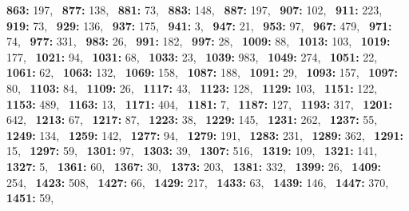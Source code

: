 \textbf{863:} 197,\allowbreak~ 
\textbf{877:} 138,\allowbreak~ 
\textbf{881:} 73,\allowbreak~ 
\textbf{883:} 148,\allowbreak~ 
\textbf{887:} 197,\allowbreak~ 
\textbf{907:} 102,\allowbreak~ 
\textbf{911:} 223,\allowbreak~ 
\textbf{919:} 73,\allowbreak~ 
\textbf{929:} 136,\allowbreak~ 
\textbf{937:} 175,\allowbreak~ 
\textbf{941:} 3,\allowbreak~ 
\textbf{947:} 21,\allowbreak~ 
\textbf{953:} 97,\allowbreak~ 
\textbf{967:} 479,\allowbreak~ 
\textbf{971:} 74,\allowbreak~ 
\textbf{977:} 331,\allowbreak~ 
\textbf{983:} 26,\allowbreak~ 
\textbf{991:} 182,\allowbreak~ 
\textbf{997:} 28,\allowbreak~ 
\textbf{1009:} 88,\allowbreak~ 
\textbf{1013:} 103,\allowbreak~ 
\textbf{1019:} 177,\allowbreak~ 
\textbf{1021:} 94,\allowbreak~ 
\textbf{1031:} 68,\allowbreak~ 
\textbf{1033:} 23,\allowbreak~ 
\textbf{1039:} 983,\allowbreak~ 
\textbf{1049:} 274,\allowbreak~ 
\textbf{1051:} 22,\allowbreak~ 
\textbf{1061:} 62,\allowbreak~ 
\textbf{1063:} 132,\allowbreak~ 
\textbf{1069:} 158,\allowbreak~ 
\textbf{1087:} 188,\allowbreak~ 
\textbf{1091:} 29,\allowbreak~ 
\textbf{1093:} 157,\allowbreak~ 
\textbf{1097:} 80,\allowbreak~ 
\textbf{1103:} 84,\allowbreak~ 
\textbf{1109:} 26,\allowbreak~ 
\textbf{1117:} 43,\allowbreak~ 
\textbf{1123:} 128,\allowbreak~ 
\textbf{1129:} 103,\allowbreak~ 
\textbf{1151:} 122,\allowbreak~ 
\textbf{1153:} 489,\allowbreak~ 
\textbf{1163:} 13,\allowbreak~ 
\textbf{1171:} 404,\allowbreak~ 
\textbf{1181:} 7,\allowbreak~ 
\textbf{1187:} 127,\allowbreak~ 
\textbf{1193:} 317,\allowbreak~ 
\textbf{1201:} 642,\allowbreak~ 
\textbf{1213:} 67,\allowbreak~ 
\textbf{1217:} 87,\allowbreak~ 
\textbf{1223:} 38,\allowbreak~ 
\textbf{1229:} 145,\allowbreak~ 
\textbf{1231:} 262,\allowbreak~ 
\textbf{1237:} 55,\allowbreak~ 
\textbf{1249:} 134,\allowbreak~ 
\textbf{1259:} 142,\allowbreak~ 
\textbf{1277:} 94,\allowbreak~ 
\textbf{1279:} 191,\allowbreak~ 
\textbf{1283:} 231,\allowbreak~ 
\textbf{1289:} 362,\allowbreak~ 
\textbf{1291:} 15,\allowbreak~ 
\textbf{1297:} 59,\allowbreak~ 
\textbf{1301:} 97,\allowbreak~ 
\textbf{1303:} 39,\allowbreak~ 
\textbf{1307:} 516,\allowbreak~ 
\textbf{1319:} 109,\allowbreak~ 
\textbf{1321:} 141,\allowbreak~ 
\textbf{1327:} 5,\allowbreak~ 
\textbf{1361:} 60,\allowbreak~ 
\textbf{1367:} 30,\allowbreak~ 
\textbf{1373:} 203,\allowbreak~ 
\textbf{1381:} 332,\allowbreak~ 
\textbf{1399:} 26,\allowbreak~ 
\textbf{1409:} 254,\allowbreak~ 
\textbf{1423:} 508,\allowbreak~ 
\textbf{1427:} 66,\allowbreak~ 
\textbf{1429:} 217,\allowbreak~ 
\textbf{1433:} 63,\allowbreak~ 
\textbf{1439:} 146,\allowbreak~ 
\textbf{1447:} 370,\allowbreak~ 
\textbf{1451:} 59,\allowbreak~ 
